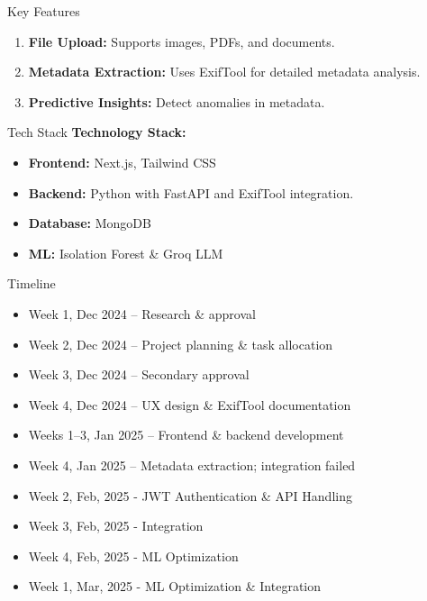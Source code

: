 \documentclass{beamer}
\begin{document}
\begin{frame}{Key Features}
    \begin{enumerate}
        \item \textbf{File Upload:} Supports images, PDFs, and documents.
        \item \textbf{Metadata Extraction:} Uses ExifTool for detailed metadata analysis.
        
        \item \textbf{Predictive Insights:} Detect anomalies in metadata.
        
    \end{enumerate}
\end{frame}



\begin{frame}{Tech Stack}
    \textbf{Technology Stack:}
    \begin{itemize}
        \item \textbf{Frontend:} Next.js, Tailwind CSS
        \item \textbf{Backend:} Python with FastAPI and ExifTool integration.
        \item \textbf{Database:} MongoDB
        \item \textbf{ML:} Isolation Forest \& Groq LLM
    \end{itemize}
\end{frame}



\begin{frame}{Timeline}
      
           
        \begin{itemize}
            \item Week 1, Dec 2024 – Research \& approval 
            \item Week 2, Dec 2024 – Project planning \& task allocation
            \item Week 3, Dec 2024 – Secondary approval 
            \item Week 4, Dec 2024 – UX design \& ExifTool documentation
            \item Weeks 1–3, Jan 2025 – Frontend \& backend development 
            \item Week 4, Jan 2025 – Metadata extraction; integration failed
            
            \item Week 2, Feb, 2025 - JWT Authentication \& API Handling
            \item Week 3, Feb, 2025 - Integration 
            \item Week 4, Feb, 2025 - ML Optimization
            \item Week 1, Mar, 2025 - ML Optimization \& Integration
        \end{itemize}
    
\end{frame}
\end{document}
